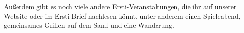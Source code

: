 
\normalsize
Außerdem gibt es noch viele andere Ersti-Veranstaltungen, die ihr auf unserer Website oder im Ersti-Brief nachlesen könnt, unter anderem einen Spieleabend, gemeinsames Grillen auf dem Sand und eine Wanderung.

